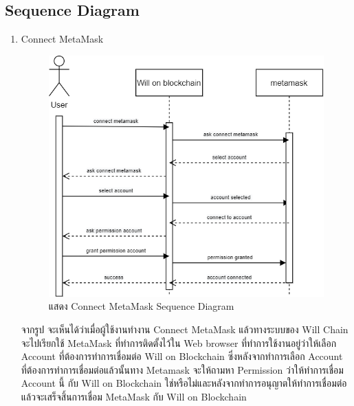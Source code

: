 \documentclass[12pt,oneside,openright,a4paper]{cpe-thai-project}
\begin{document}
\subsection{Sequence Diagram}
	\begin{enumerate}[label=\thesubsection.\arabic*,leftmargin=0pt,itemindent=2.5cm]
	\item Connect MetaMask
		\begin{table}
		\centering
		\caption{ตารางแสดงรายละเอียดของ Use Case Connect meta mask Wallet}
		\end{table}
		\begin{figure}[!thb]
			\centering
			\includegraphics[scale=0.2]{connectMetamaskSeq}
			\caption{แสดง Connect MetaMask Sequence Diagram}
		\end{figure}
		\FloatBarrier
	\tab จากรูป จะเห็นได้ว่าเมื่อผู้ใช้งานทํางาน Connect MetaMask แล้วทางระบบของ Will Chain จะไปเรียกใช้ MetaMask ที่ทําการติดตั้งไว้ใน Web browser ที่ทําการใช้งานอยู่ว่าให้เลือก Account ที่ต้องการทําการเชื่อมต่อ Will on Blockchain ซึ่งหลังจากทําการเลือก Account ที่ต้องการทําการเชื่อมต่อแล้วนั้นทาง Metamask จะให้ถามหา Permission ว่าให้ทําการเชื่อม Account นี้ กับ Will on Blockchain ใช่หรือไม่และหลังจากทําการอนุญาตให้ทําการเชื่อมต่อแล้วจะเสร็จสิ้นการเชื่อม MetaMask กับ Will on Blockchain

\end{enumerate}
\end{document}

